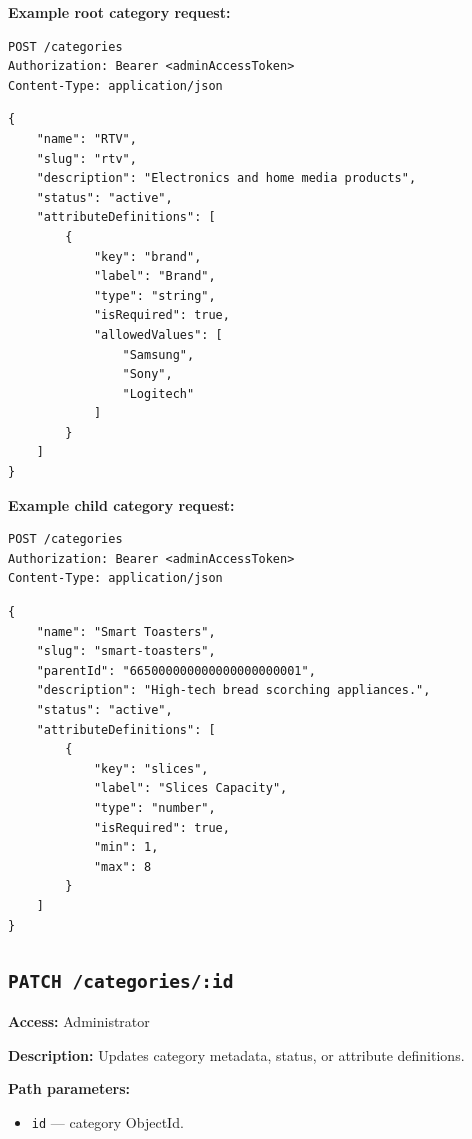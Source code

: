 \textbf{Example root category request:}

\begin{verbatim}
POST /categories
Authorization: Bearer <adminAccessToken>
Content-Type: application/json
\end{verbatim}

\begin{verbatim}
{
    "name": "RTV",
    "slug": "rtv",
    "description": "Electronics and home media products",
    "status": "active",
    "attributeDefinitions": [
        {
            "key": "brand",
            "label": "Brand",
            "type": "string",
            "isRequired": true,
            "allowedValues": [
                "Samsung",
                "Sony",
                "Logitech"
            ]
        }
    ]
}
\end{verbatim}

\pagebreak
\textbf{Example child category request:}

\begin{verbatim}
POST /categories
Authorization: Bearer <adminAccessToken>
Content-Type: application/json
\end{verbatim}

\begin{verbatim}
{
    "name": "Smart Toasters",
    "slug": "smart-toasters",
    "parentId": "665000000000000000000001",
    "description": "High-tech bread scorching appliances.",
    "status": "active",
    "attributeDefinitions": [
        {
            "key": "slices",
            "label": "Slices Capacity",
            "type": "number",
            "isRequired": true,
            "min": 1,
            "max": 8
        }
    ]
}
\end{verbatim}

\subsection{\texttt{PATCH /categories/:id}}

\textbf{Access:} Administrator

\textbf{Description:} Updates category metadata, status, or attribute definitions.

\textbf{Path parameters:}

\begin{itemize}
    \item \texttt{id} --- category ObjectId.
\end{itemize}


